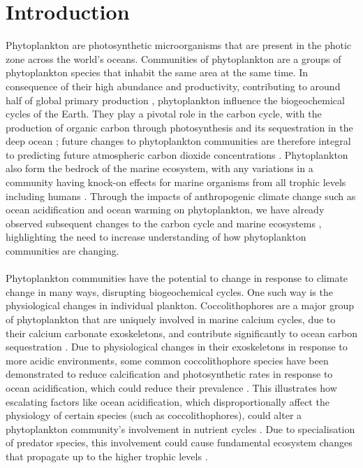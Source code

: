\documentclass{article}
\begin{document}
\section{Introduction}
Phytoplankton are photosynthetic microorganisms that are present in the photic zone across the world’s oceans. Communities of phytoplankton are a groups of phytoplankton species that inhabit the same area at the same time. In consequence of their high abundance and productivity, contributing to around half of global primary production \citep{field_primary_1998}, phytoplankton influence the biogeochemical cycles of the Earth. They play a pivotal role in the carbon cycle, with the production of organic carbon through photosynthesis and its sequestration in the deep ocean \citep{street_iron_2005}; future changes to phytoplankton communities are therefore integral to predicting future atmospheric carbon dioxide concentrations \citep{passow_u_biological_2012}. Phytoplankton also form the bedrock of the marine ecosystem, with any variations in a community having knock-on effects for marine organisms from all trophic levels including humans \citep{vargas_phytoplankton_2006,danielsdottir_phytoplankton_2007}. Through the impacts of anthropogenic climate change such as ocean acidification and ocean warming on phytoplankton, we have already observed subsequent changes to the carbon cycle \citep{herrmann_impact_2014} and marine ecosystems \citep{frederiksen_plankton_2006}, highlighting the need to increase understanding of how phytoplankton communities are changing. \\ \\
\noindent
Phytoplankton communities have the potential to change in response to climate change in many ways, disrupting biogeochemical cycles. One such way is the physiological changes in individual plankton. Coccolithophores are a major group of phytoplankton that are uniquely involved in marine calcium cycles, due to their calcium carbonate exoskeletons, and contribute significantly to ocean carbon sequestration \citep{arundhathy_coccolithophores_2021}. Due to physiological changes in their exoskeletons in response to more acidic environments, some common coccolithophore species have been demonstrated to reduce calcification and photosynthetic rates in response to ocean acidification, which could reduce their prevalence \citep{meyer_reviews_2015}. This illustrates how escalating factors like ocean acidification, which disproportionally affect the physiology of certain species (such as coccolithophores), could alter a phytoplankton community’s involvement in nutrient cycles \citep{marinov_response_2010,mcmahon_millennial-scale_2015}. Due to specialisation of predator species, this involvement could cause fundamental ecosystem changes that propagate up to the higher trophic levels \citep{frederiksen_plankton_2006}.\\ \\
\end{document}
